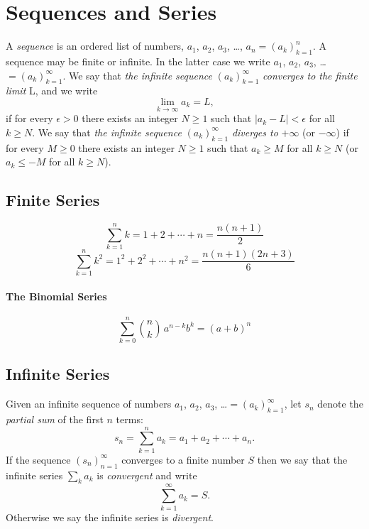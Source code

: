 \documentclass[captions=tableheading]{scrbook}
\begin{document}
\section{Sequences and Series \label{sec:Sequences-and-Series}}
\label{sec-21-3}


A \emph{sequence} is an ordered list of numbers, \(a_{1}\), \(a_{2}\), \(a_{3}\), \ldots{}, \(a_{n} =\left(a_{k}\right)_{k=1}^{n}\). A sequence may be finite or infinite. In the latter case we write \(a_{1}\), \(a_{2}\), \(a_{3}\), \ldots{} \( =\left(a_{k}\right)_{k=1}^{\infty}\). We say that \emph{the infinite sequence} \(\left(a_{k}\right)_{k=1}^{\infty}\) \emph{converges to the finite limit} L, and we write
\begin{equation}
\lim_{k\to\infty}a_{k} = L,
\end{equation}
if for every \(\epsilon > 0\) there exists an integer \(N \geq 1\) such that \(|a_{k} - L| < \epsilon\) for all \(k \geq N\). We say that \emph{the infinite sequence} \(\left(a_{k}\right)_{k=1}^{\infty}\) \emph{diverges to} \(+\infty\) (or \( -\infty\)) if for every \(M\geq0\) there exists an integer \(N\geq1\) such that \(a_{k} \geq M\) for all \(k \geq N\) (or \(a_{k} \leq - M\) for all \(k \geq N\)).
\subsection{Finite Series}
\label{sec-21-3-1}


\begin{equation}
\sum_{k=1}^{n}k=1+2+\cdots+n=\frac{n(n+1)}{2}\label{eq:gauss-series}
\end{equation}
\begin{equation}
\sum_{k=1}^{n}k^{2}=1^{2}+2^{2}+\cdots+n^{2}=\frac{n(n+1)(2n+3)}{6}\label{eq:gauss-series-sq}
\end{equation}


\paragraph*{The Binomial Series}
\begin{equation}
\sum_{k=0}^{n}{n \choose k}\, a^{n-k}b^{k}=(a+b)^{n}\label{eq:binom-series}
\end{equation}
\subsection{Infinite Series}
\label{sec-21-3-2}


Given an infinite sequence of numbers \(a_{1}\), \(a_{2}\), \(a_{3}\), \ldots{}\(=\left(a_{k}\right)_{k=1}^{\infty}\), let \(s_{n}\) denote the \emph{partial sum} of the first \(n\) terms:
\begin{equation}
s_{n}=\sum_{k=1}^{n}a_{k}=a_{1}+a_{2}+\cdots+a_{n}.
\end{equation}
If the sequence \(\left(s_{n}\right)_{n=1}^{\infty}\) converges to a finite number \(S\) then we say that the infinite series \(\sum_{k}a_{k}\) is \emph{convergent} and write
\begin{equation}
\sum_{k=1}^{\infty}a_{k}=S.
\end{equation}
Otherwise we say the infinite series is \emph{divergent}.
\end{document}

